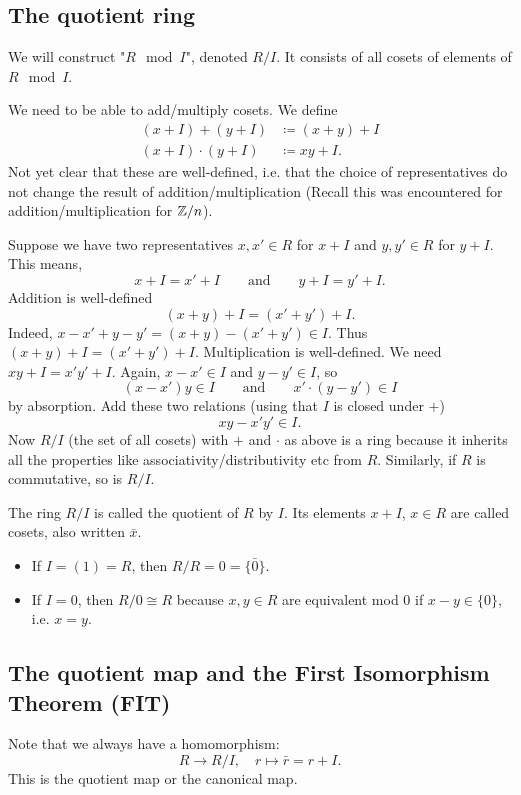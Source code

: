 \documentclass[10pt, a4paper]{article}
\begin{document}
\subsection{The quotient ring}
We will construct
"$R\mod{I}$",
denoted $R / I$.
It consists of all cosets of elements of $R\mod{I}$.

We need to be able to add/multiply cosets.
We define
\begin{align*}
    (x + I) + (y + I) &\coloneqq (x + y) + I \\
    (x + I) \cdot (y + I) &\coloneqq xy + I.
\end{align*}
Not yet clear that these are well-defined,
i.e.
that the choice of representatives do not change the result of addition/multiplication
(Recall this was encountered for addition/multiplication for $\mathbb{Z} / n$).

Suppose we have two representatives $x, x' \in R$ for $x + I$ and $y, y' \in R$ for $y + I$.
This means,
\[
x + I = x' + I\qquad\text{and}\qquad y + I = y' + I.
\]
Addition is well-defined
\[
(x + y) + I = (x' + y') + I.
\]
Indeed,
$x - x' + y - y' = (x + y) - (x' + y') \in I$.
Thus $(x + y) + I = (x' + y') + I$.
Multiplication is well-defined.
We need $xy + I = x'y' + I$.
Again,
$x - x' \in I$ and $y - y' \in I$,
so
\[
(x - x')y \in I\qquad\text{and}\qquad x' \cdot (y - y') \in I
\]
by absorption.
Add these two relations
(using that $I$ is closed under $+$)
\[
xy - x'y' \in I.
\]
Now $R / I$
(the set of all cosets)
with $+$ and $\cdot$ as above is a ring because it inherits all the properties like associativity/distributivity etc from $R$.
Similarly,
if $R$ is commutative,
so is $R / I$.

\begin{definition}
    The ring $R / I$ is called the quotient of $R$ by $I$.
    Its elements $x + I$,
    $x \in R$ are called cosets,
    also written $\bar{x}$.

    \begin{itemize}
        \item If $I = (1) = R$,
        then $R / R = 0 = \{\bar{0}\}$.

        \item If $I = 0$,
        then $R / 0 \cong R$ because $x, y \in R$ are equivalent mod $0$ if $x - y \in \{0\}$,
        i.e. $x = y$.
    \end{itemize}
\end{definition}

\subsection{The quotient map and the First Isomorphism Theorem
    (FIT)}
Note that we always have a homomorphism:
\[
R \to R / I,\quad r \mapsto \bar{r} = r + I.
\]
This is the quotient map or the canonical map.
\end{document}
